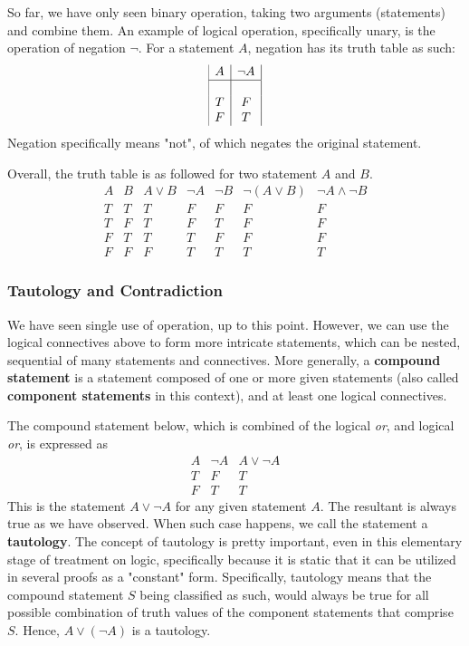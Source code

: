 So far, we have only seen binary operation, taking two arguments (statements) and combine them. An example of logical operation, specifically unary, is the operation of negation $\neg$. For a statement $A$, negation has its truth table as such:
$$
\begin{array}{{|c |c|}} 
A & \neg A  \\
\hline & \\
T & F \\
F & T
\end{array}
$$
Negation specifically means "not", of which negates the original statement. 

Overall, the truth table is as followed for two statement $A$ and $B$. 
$$
\begin{array}{|c|c|c|c|c|c|c|}
A & B & A \lor B  & \neg A & \neg B & \neg(A \lor B) & \neg A \land \neg B \\
T & T & T & F & F & F & F \\
T & F & T & F & T & F & F \\
F & T & T & T & F & F & F \\
F & F & F & T & T & T & T
\end{array}
$$

\subsubsection{Tautology and Contradiction}

We have seen single use of operation, up to this point. However, we can use the logical connectives above to form more intricate statements, which can be nested, sequential of many statements and connectives. More generally, a \textbf{compound statement} is a statement composed of one or more given statements (also called \textbf{component statements} in this context), and at least one logical connectives. 

The compound statement below, which is combined of the logical \textit{or}, and logical \textit{or}, is expressed as
$$\begin{array}{|c|c|c|}
    A & \neg A & A \lor \neg A \\
    T & F & T \\
    F & T & T
\end{array}$$
This is the statement $A \lor \neg A$ for any given statement $A$. The resultant is always true as we have observed. When such case happens, we call the statement a \textbf{tautology}. The concept of  tautology is pretty important, even in this elementary stage of treatment on logic, specifically because it is static that it can be utilized in several proofs as a "constant" form. Specifically, tautology means that the compound statement $S$ being classified as such, would always be true for all possible combination of truth values of the component statements that comprise $S$. Hence, $A \lor (\lnot A)$ is a tautology. 

